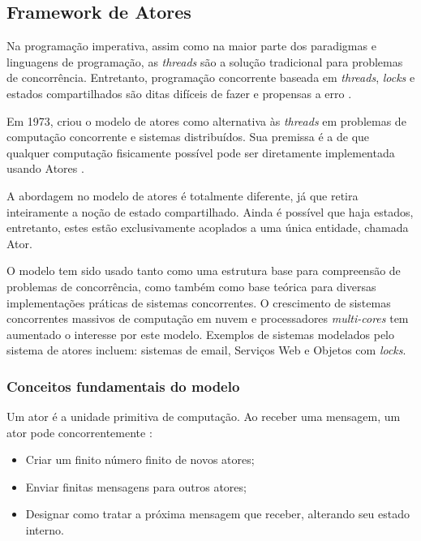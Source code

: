 \subsection{Framework de Atores}
\label{actorframework}



Na programação imperativa, assim como na maior parte dos paradigmas e linguagens de programação, as \textit{threads} são a solução tradicional para problemas de concorrência. Entretanto, programação concorrente baseada em \textit{threads}, \textit{locks} e estados compartilhados são ditas difíceis de fazer e propensas a erro \citep{Erb2012}. 

Em 1973, \citet{hewitt1973session} criou o modelo de atores como alternativa às \textit{threads} em problemas de computação concorrente e sistemas distribuídos. Sua premissa é a de que qualquer computação fisicamente possível pode ser diretamente implementada usando Atores \citep{hewitt2010actor}. 

 A abordagem no modelo de atores é totalmente diferente, já que retira inteiramente a noção de estado compartilhado. Ainda é possível que haja estados, entretanto, estes estão exclusivamente acoplados a uma única entidade, chamada Ator.

O modelo tem sido usado tanto como uma estrutura base para compreensão de problemas de concorrência, como também como base teórica para diversas implementações práticas de sistemas concorrentes. O crescimento de sistemas concorrentes massivos de computação em nuvem e processadores \textit{multi-cores} tem aumentado o interesse por este modelo. Exemplos de sistemas modelados pelo sistema de atores incluem: sistemas de email, Serviços Web e Objetos com \textit{locks}.

\subsubsection{Conceitos fundamentais do modelo}

Um ator é a unidade primitiva de computação. Ao receber uma mensagem, um ator pode concorrentemente \citep{hewitt2013computation}:

\begin{itemize}
    \item Criar um finito número finito de novos atores;
    \item Enviar finitas mensagens para outros atores;
    \item Designar como tratar a próxima mensagem que receber, alterando seu estado interno.
\end{itemize}


